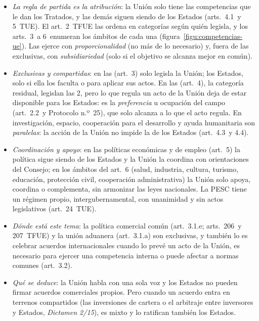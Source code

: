 \documentclass[11pt]{article}
\begin{document}
\begin{itemize}
\item \emph{La regla de partida es la atribución}: la Unión solo tiene las competencias que le dan los Tratados, y las demás siguen siendo de los Estados (arts.~4.1~y 5~TUE). El art.~2~TFUE las ordena en categorías según quién legisla, y los arts.~3~a 6~enumeran los ámbitos de cada una (figura~\ref{figu:competencias-ue}). Las ejerce con \emph{proporcionalidad} (no más de lo necesario) y, fuera de las exclusivas, con \emph{subsidiariedad} (solo si el objetivo se alcanza mejor en común).
\item \emph{Exclusivas y compartidas}: en las  (art.~3) solo legisla la Unión; los Estados, solo si ella los faculta o para aplicar sus actos. En las  (art.~4), la categoría residual, legislan las 2, pero lo que regula un acto de la Unión deja de estar disponible para los Estados: es la \emph{preferencia} u ocupación del campo (art.~2.2~y Protocolo n.º~25), que solo alcanza a lo que el acto regula. En investigación, espacio, cooperación para el desarrollo y ayuda humanitaria son \emph{paralelas}: la acción de la Unión no impide la de los Estados (art.~4.3~y 4.4).
\item \emph{Coordinación y apoyo}: en las políticas económicas y de empleo (art.~5) la política sigue siendo de los Estados y la Unión la coordina con orientaciones del Consejo; en los ámbitos del art.~6 (salud, industria, cultura, turismo, educación, protección civil, cooperación administrativa) la Unión solo apoya, coordina o complementa, sin armonizar las leyes nacionales. La PESC tiene un régimen propio, intergubernamental, con unanimidad y sin actos legislativos (art.~24~TUE).
\item \emph{Dónde está este tema}: la política comercial común (art.~3.1.e; arts.~206~y 207~TFUE) y la unión aduanera (art.~3.1.a) son exclusivas, y también lo es celebrar acuerdos internacionales cuando lo prevé un acto de la Unión, es necesario para ejercer una competencia interna o puede afectar a normas comunes (art.~3.2).
\item \emph{Qué se deduce}: la Unión habla con una sola voz y los Estados no pueden firmar acuerdos comerciales propios. Pero cuando un acuerdo entra en terrenos compartidos (las inversiones de cartera o el arbitraje entre inversores y Estados, \emph{Dictamen 2/15}), es mixto y lo ratifican también los Estados.
\end{itemize}

\begin{infografia}[H]
\centering
\caption{El reparto de competencias de la Unión (arts.~2~a 6~TFUE): la política comercial común}\label{figu:competencias-ue}
\end{infografia}
\end{document}
